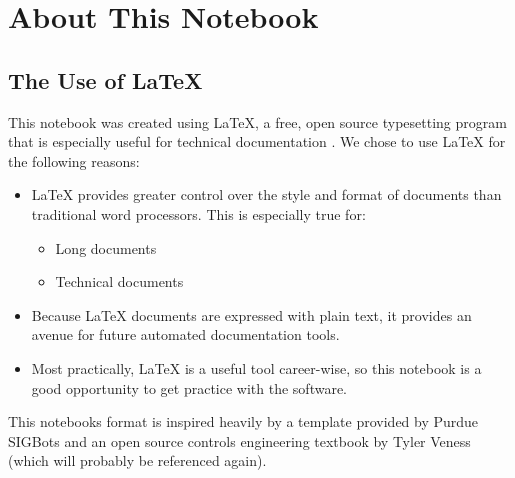 \chapter{About This Notebook}

\section{The Use of \LaTeX{}} This notebook was created using \LaTeX{}, a free,
open source typesetting program that is especially useful for technical
documentation \cite{bib:latex}.  We chose to use \LaTeX{} for the following
reasons:
\begin{itemize}
      \item \LaTeX{} provides greater control over the style and format of
            documents than traditional word processors. This is especially true
            for:
            \begin{itemize}
                  \item Long documents
                  \item Technical documents
            \end{itemize}
      \item Because \LaTeX{} documents are expressed with plain text, it
            provides an avenue for future automated documentation tools.
      \item Most practically, \LaTeX{} is a useful tool career-wise, so this
            notebook is a good opportunity to get practice with the software.
\end{itemize}
This notebooks format is inspired heavily by a template provided by Purdue
SIGBots \cite{bib:purduenotebook} and an open source controls engineering
textbook by Tyler Veness \cite{bib:controlinfrc} (which will probably be
referenced again).

